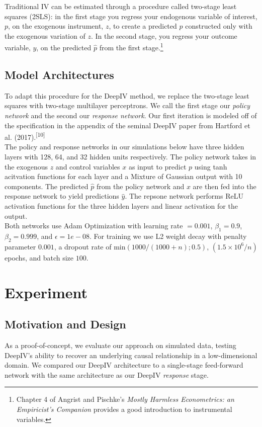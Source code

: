 \documentclass[10.5pt, oneside, twocolumn]{article}   	%
\begin{document}
Traditional IV can be estimated through a procedure called two-stage least squares (2SLS): in the first stage you regress your endogenous variable of interest, $p$,  on the exogenous instrument, $z$, to create a predicted $\hat{p}$ constructed only with the exogenous variation of $z$. In the second stage, you regress your outcome variable, $y$, on the predicted $\hat{p}$ from the first stage.\footnote{Chapter 4 of Angrist and Pischke's \emph{Mostly Harmless Econometrics: an Empiricist's Companion} provides a good introduction to instrumental variables.}\\

\subsection{Model Architectures}

To adapt this procedure for the DeepIV method, we replace the two-stage least squares with two-stage multilayer perceptrons. We call the first stage our \emph{policy network} and the second our \emph{response network}. Our first iteration is modeled off of the specification in the appendix of the seminal DeepIV paper from Hartford et al. (2017).\textsuperscript{[10]}\\

The policy and response networks in our simulations below have three hidden layers with 128, 64, and 32 hidden units respectively. The policy network takes in the exogenous $z$ and control variables $x$ as input to predict $p$ using tanh acitvation functions for each layer and a Mixture of Gaussian output with 10 components. The predicted $\hat{p}$ from the policy network and $x$ are then fed into the response network to yield predictions $\hat{y}$. The repsone network performs ReLU activation functions for the three hidden layers and linear activation for the output. \\

Both networks use Adam Optimization with learning rate $=0.001$, $\beta_1 = 0.9$, $\beta_2 = 0.999$, and $\epsilon = 1e-08$. For training we use L2 weight decay with penalty parameter $0.001$, a dropout rate of $\textrm{min}(1000/(1000+n); 0.5)$, $(1.5 \times 10^6/n)$ epochs, and batch size $100$. 


\section{Experiment}
\subsection{Motivation and Design}
As a proof-of-concept, we evaluate our approach on simulated data, testing DeepIV's ability to recover an underlying causal relationship in a low-dimensional domain. We compared our DeepIV architecture to a single-stage feed-forward network with the same architecture as our  DeepIV \emph{response} stage. 
\end{document}
